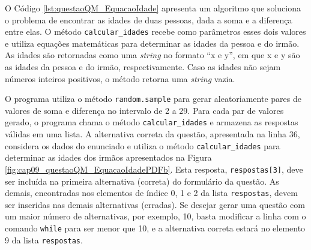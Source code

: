 O Código \ref{lst:questaoQM_EquacaoIdade} apresenta um algoritmo que soluciona o problema de encontrar as idades de duas pessoas, dada a soma e a diferença entre elas. O método \verb|calcular_idades| recebe como parâmetros esses dois valores e utiliza equações matemáticas para determinar as idades da pessoa e do irmão. As idades são retornadas como uma \textit{string} no formato ``x e y'', em que x e y são as idades da pessoa e do irmão, respectivamente. Caso as idades não sejam números inteiros positivos, o método retorna uma \textit{string} vazia.

O programa utiliza o método \verb|random.sample| para gerar aleatoriamente pares de valores de soma e diferença no intervalo de 2 a 29. Para cada par de valores gerado, o programa chama o método \verb|calcular_idades| e armazena as respostas válidas em uma lista. A alternativa correta da questão, apresentada na linha 36, considera os dados do enunciado e utiliza o método \verb|calcular_idades| para determinar as idades dos irmãos apresentados na Figura \ref{fig:cap09_questaoQM_EquacaoIdadePDFb}. Esta resposta, \verb|respostas[3]|, deve ser incluída na primeira alternativa (correta) do formulário da questão. As demais, encontradas nos elementos de índice 0, 1 e 2 da lista \verb|respostas|, devem ser inseridas nas demais alternativas (erradas). Se desejar gerar uma questão com um maior número de alternativas, por exemplo, 10, basta modificar a linha com o comando \verb|while| para ser menor que 10, e a alternativa correta estará no elemento 9 da lista \verb|respostas|.

